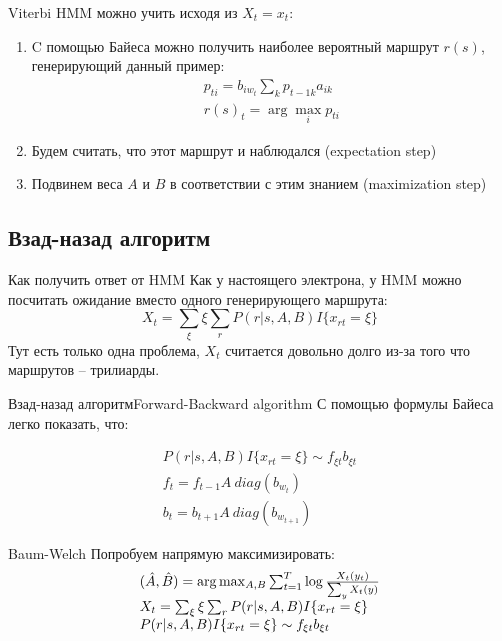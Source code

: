 \documentclass[14pt, fleqn, xcolor={dvipsnames, table}]{beamer}
\begin{document}
\begin{frame}{Viterbi}
HMM можно учить исходя из $X_t = x_t$:
\begin{enumerate}
  \item  C помощью Байеса можно получить наиболее вероятный маршрут $r(s)$, генерирующий данный пример:
$$\begin{array}{l}
p_{ti} = b_{iw_t} \sum_k p_{{t - 1}k} a_{ik} \\
r(s)_t = \arg \max_i p_{ti}
\end{array}$$
  \item Будем считать, что этот маршрут и наблюдался (expectation step)
  \item Подвинем веса $A$ и $B$ в соответствии с этим знанием (maximization step)
\end{enumerate}
\end{frame}

\subsection{Взад-назад алгоритм}

\begin{frame}{Как получить ответ от HMM}
Как у настоящего электрона, у HMM можно посчитать ожидание вместо одного генерирующего маршрута:
$$
X_t = \sum_\xi \xi \sum_r P(r|s,A,B) I\{x_{rt} = \xi\}
$$
Тут есть только одна проблема, $X_t$ считается довольно долго из-за того что маршрутов -- трилиарды.
\end{frame}

\begin{frame}{Взад-назад алгоритм}{Forward-Backward algorithm}
С помощью формулы Байеса легко показать, что:

$$\begin{array}{l}
P(r|s,A,B) I\{x_{rt} = \xi\} \sim f_{\xi t} b_{\xi t} \\
f_{t}  = f_{t-1} A\ diag(b_{w_t}) \\
b_{t}  = b_{t+1} A\ diag(b_{w_{t+1}})
\end{array}$$
\end{frame}


\begin{frame}{Baum-Welch}
Попробуем напрямую максимизировать:
$$\begin{array}{l}
(\hat{A}, \hat{B}) = \arg \max_{A,B} \sum_{t=1}^{T} \log {X_t(y_t) \over \sum_y X_t(y)} \\
X_t = \sum_\xi \xi \sum_r P(r|s,A,B) I\{x_{rt} = \xi\} \\
P(r|s,A,B) I\{x_{rt} = \xi\} \sim f_{\xi t} b_{\xi t} \\
\end{array}$$
\small
{}
\end{frame}
\end{document}
